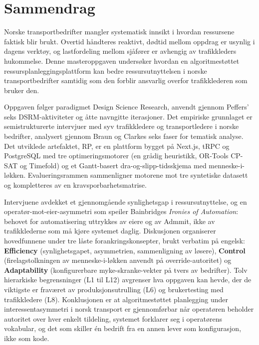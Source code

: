 \chapter*{Sammendrag}

Norske transportbedrifter mangler systematisk innsikt i hvordan ressursene faktisk blir brukt. Overtid håndteres reaktivt, dødtid mellom oppdrag er usynlig i dagens verktøy, og lastfordeling mellom sjåfører er avhengig av trafikkleders hukommelse. Denne masteroppgaven undersøker hvordan en algoritmestøttet ressursplanleggingsplattform kan bedre ressursutnyttelsen i norske transportbedrifter samtidig som den forblir ansvarlig overfor trafikklederen som bruker den.

Oppgaven følger paradigmet Design Science Research, anvendt gjennom Peffers' seks DSRM-aktiviteter og åtte navngitte iterasjoner. Det empiriske grunnlaget er semistrukturerte intervjuer med syv trafikkledere og transportledere i norske bedrifter, analysert gjennom Braun og Clarkes seks faser for tematisk analyse. Det utviklede artefaktet, RP, er en plattform bygget på Next.js, tRPC og PostgreSQL med tre optimeringsmotorer (en grådig heuristikk, OR-Tools CP-SAT og Timefold) og et Gantt-basert dra-og-slipp-tidsskjema med menneske-i-løkken. Evalueringsrammen sammenligner motorene mot tre syntetiske datasett og kompletteres av en kravsporbarhetsmatrise.

Intervjuene avdekket et gjennomgående synlighetsgap i ressursutnyttelse, og en operatør-mot-eier-asymmetri som speiler Bainbridges \emph{Ironies of Automation}: behovet for automatisering uttrykkes av eiere og av Admmit, ikke av trafikklederne som må kjøre systemet daglig. Diskusjonen organiserer hovedfunnene under tre låste forankringskonsepter, brukt verbatim på engelsk: \textbf{Efficiency} (synlighetsgapet, asymmetrien, sammenligning av løsere), \textbf{Control} (firelagstolkningen av menneske-i-løkken anvendt på override-autoritet) og \textbf{Adaptability} (konfigurerbare myke-skranke-vekter på tvers av bedrifter). Tolv hierarkiske begrensninger (L1 til L12) avgrenser hva oppgaven kan hevde, der de viktigste er fraværet av produksjonsutrulling (L6) og brukertesting med trafikkledere (L8). Konklusjonen er at algoritmestøttet planlegging under interessentasymmetri i norsk transport er gjennomførbar når operatøren beholder autoritet over hver enkelt tildeling, systemet forklarer seg i operatørens vokabular, og det som skiller én bedrift fra en annen lever som konfigurasjon, ikke som kode.
